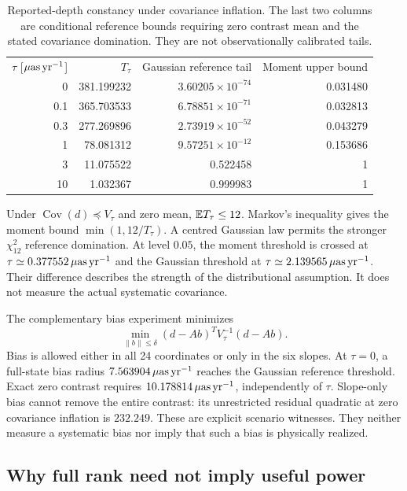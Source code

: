 \begin{table}[ht]
\caption{Reported-depth constancy under covariance inflation. The last two columns are conditional reference bounds requiring zero contrast mean and the stated covariance domination. They are not observationally calibrated tails.}
\label{tab:depthcov}
\begin{ruledtabular}\begin{tabular}{rrrr}
$\tau$ [$\mu\mathrm{as}\,\mathrm{yr}^{-1}$]&$T_\tau$&Gaussian reference tail&Moment upper bound\\
0&381.199232&$3.60205\times10^{-74}$&0.031480\\
0.1&365.703533&$6.78851\times10^{-71}$&0.032813\\
0.3&277.269896&$2.73919\times10^{-52}$&0.043279\\
1&78.081312&$9.57251\times10^{-12}$&0.153686\\
3&11.075522&0.522458&1\\
10&1.032367&0.999983&1
\end{tabular}\end{ruledtabular}
\end{table}

Under $\operatorname{Cov}(d)\preceq V_\tau$ and zero mean, $\mathbb E T_\tau\leq12$. Markov's inequality gives the moment bound $\min(1,12/T_\tau)$. A centred Gaussian law permits the stronger $\chi^2_{12}$ reference domination. At level $0.05$, the moment threshold is crossed at $\tau\simeq0.377552\,\mu\mathrm{as}\,\mathrm{yr}^{-1}$ and the Gaussian threshold at $\tau\simeq2.139565\,\mu\mathrm{as}\,\mathrm{yr}^{-1}$. Their difference describes the strength of the distributional assumption. It does not measure the actual systematic covariance.

The complementary bias experiment minimizes
\begin{equation}
 \min_{\|b\|\leq\delta}(d-Ab)^TV_\tau^{-1}(d-Ab).
 \label{eq:bias}
\end{equation}
Bias is allowed either in all 24 coordinates or only in the six slopes. At $\tau=0$, a full-state bias radius $7.563904\,\mu\mathrm{as}\,\mathrm{yr}^{-1}$ reaches the Gaussian reference threshold. Exact zero contrast requires $10.178814\,\mu\mathrm{as}\,\mathrm{yr}^{-1}$, independently of $\tau$. Slope-only bias cannot remove the entire contrast: its unrestricted residual quadratic at zero covariance inflation is $232.249$. These are explicit scenario witnesses. They neither measure a systematic bias nor imply that such a bias is physically realized.

\subsection{Why full rank need not imply useful power}

